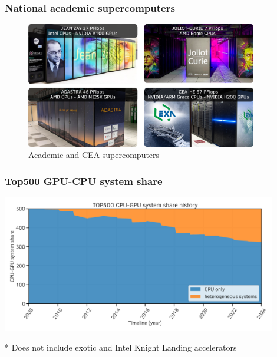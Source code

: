 \documentclass[aspectratio=169]{beamer}
\begin{document}

\begin{frame}
\frametitle{National academic supercomputers}

\begin{figure}
    \begin{center}
    \includegraphics[width=0.9\textwidth]{../../images/french_super_computers.png}
    \caption{Academic and CEA supercomputers}
    \end{center}
\end{figure}

\end{frame}


\begin{frame}
    \frametitle{Top500 GPU-CPU system share}

\begin{center}
    \includegraphics[width=0.9\textwidth]{../../images/top500_cpu_gpu_share_history.png}
\end{center}

\footnotesize
* Does not include exotic and Intel Knight Landing accelerators

\end{frame}
\end{document}
